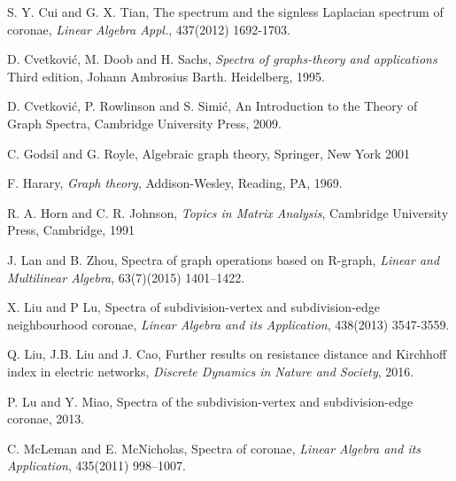 \documentclass[a4paper,12pt]{article}
\begin{document}
\begin{thebibliography}{}




 S. Y. Cui and G. X. Tian, The spectrum and the signless Laplacian spectrum of coronae, {\it Linear Algebra Appl.}, 437(2012) 1692-1703.

 D. Cvetkovi\'{c}, M. Doob and H. Sachs, 
{\it Spectra of graphs-theory and applications} Third edition, Johann Ambrosius Barth. Heidelberg, 1995.


 D. Cvetkovi\'{c}, P. Rowlinson and S. Simi\'{c}, An Introduction to the Theory of Graph Spectra, Cambridge University Press, 2009.


 C. Godsil and G. Royle, Algebraic graph theory, {Springer, New York} {2001}

 F. Harary, {\it Graph theory}, Addison-Wesley, Reading, PA, 1969.

 R. A. Horn and C. R. Johnson, {\it Topics in Matrix Analysis}, Cambridge University Press, Cambridge, {1991}


 J. Lan and B. Zhou, Spectra of graph operations based on R-graph, {\it Linear and Multilinear Algebra}, 63(7)(2015) 1401--1422.


 X. Liu and P Lu, Spectra of subdivision-vertex and subdivision-edge
neighbourhood coronae, {\it Linear Algebra and its Application}, 438(2013) 3547-3559.

 Q. Liu, J.B. Liu and J. Cao, Further results on resistance distance and Kirchhoff index in electric networks, {\it Discrete Dynamics in Nature and Society}, 2016. 

 P. Lu and Y. Miao, Spectra of the subdivision-vertex and subdivision-edge coronae, 2013.

 C. McLeman and E. McNicholas, Spectra of coronae, {\it Linear Algebra and its Application}, 435(2011) 998--1007. 

\end{thebibliography}
\end{document}
